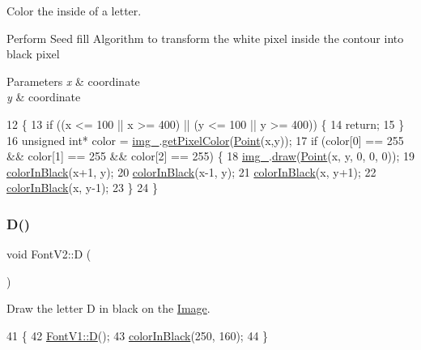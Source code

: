 Color the inside of a letter. 

Perform Seed fill Algorithm to transform the white pixel inside the contour into black pixel 
\begin{DoxyParams}{Parameters}
{\em x} & coordinate \\
\hline
{\em y} & coordinate \\
\hline
\end{DoxyParams}

\begin{DoxyCode}
12                                       \{
13     \textcolor{keywordflow}{if} ((x <= 100 || x >= 400) || (y <= 100 || y >= 400)) \{
14         \textcolor{keywordflow}{return};
15     \}
16     \textcolor{keywordtype}{unsigned} \textcolor{keywordtype}{int}* color = \mbox{\hyperlink{class_font_v1_a00569e3e3c4b70f437b63f396f735fb0}{img\_}}.\mbox{\hyperlink{class_image_adb23176701dae47479d4919f55f3aec5}{getPixelColor}}(\mbox{\hyperlink{class_point}{Point}}(x,y));
17     \textcolor{keywordflow}{if} (color[0] == 255 \&\& color[1] == 255 \&\& color[2] == 255) \{
18         \mbox{\hyperlink{class_font_v1_a00569e3e3c4b70f437b63f396f735fb0}{img\_}}.\mbox{\hyperlink{class_image_a8d162f3cab956131d58708c09aa560b0}{draw}}(\mbox{\hyperlink{class_point}{Point}}(x, y, 0, 0, 0));
19         \mbox{\hyperlink{class_font_v2_a04f2501961bc286ce70fbb6a840b0e8a}{colorInBlack}}(x+1, y);
20         \mbox{\hyperlink{class_font_v2_a04f2501961bc286ce70fbb6a840b0e8a}{colorInBlack}}(x-1, y);
21         \mbox{\hyperlink{class_font_v2_a04f2501961bc286ce70fbb6a840b0e8a}{colorInBlack}}(x, y+1);
22         \mbox{\hyperlink{class_font_v2_a04f2501961bc286ce70fbb6a840b0e8a}{colorInBlack}}(x, y-1);
23     \}
24 \}
\end{DoxyCode}
\mbox{\label{class_font_v2_ab6a088abff91bacc1096b6008296142b}} 
\subsubsection{\texorpdfstring{D()}{D()}}
{\footnotesize\ttfamily void Font\+V2\+::D (\begin{DoxyParamCaption}{ }\end{DoxyParamCaption})}



Draw the letter D in black on the \mbox{\hyperlink{class_image}{Image}}. 


\begin{DoxyCode}
41                \{
42     \mbox{\hyperlink{class_font_v1_a3f4558aabfef6e0783c2294aecf215d0}{FontV1::D}}();
43     \mbox{\hyperlink{class_font_v2_a04f2501961bc286ce70fbb6a840b0e8a}{colorInBlack}}(250, 160);
44 \}
\end{DoxyCode}
\mbox{\label{class_font_v2_a3dc7a171c913a94b688689c69abafeca}} 
